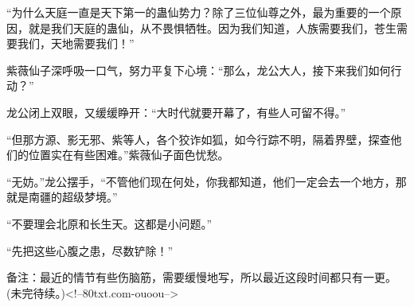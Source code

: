 \begin{this_body}
“为什么天庭一直是天下第一的蛊仙势力？除了三位仙尊之外，最为重要的一个原因，就是我们天庭的蛊仙，从不畏惧牺牲。因为我们知道，人族需要我们，苍生需要我们，天地需要我们！”

紫薇仙子深呼吸一口气，努力平复下心境：“那么，龙公大人，接下来我们如何行动？”

龙公闭上双眼，又缓缓睁开：“大时代就要开幕了，有些人可留不得。”

“但那方源、影无邪、紫等人，各个狡诈如狐，如今行踪不明，隔着界壁，探查他们的位置实在有些困难。”紫薇仙子面色忧愁。

“无妨。”龙公摆手，“不管他们现在何处，你我都知道，他们一定会去一个地方，那就是南疆的超级梦境。”

“不要理会北原和长生天。这都是小问题。”

“先把这些心腹之患，尽数铲除！”

备注：最近的情节有些伤脑筋，需要缓慢地写，所以最近这段时间都只有一更。(未完待续。)<!--80txt.com-ouoou-->

\end{this_body}

